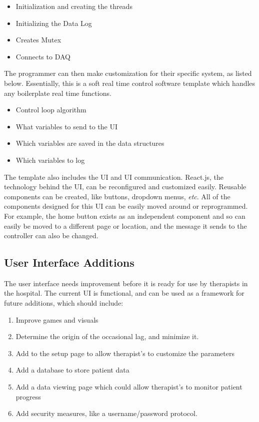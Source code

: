 \documentclass[12pt]{report}
\begin{document}
	\begin{itemize}
		\item Initialization and creating the threads
		\item Initializing the Data Log
		\item Creates Mutex
		\item Connects to DAQ
	\end{itemize}
	
	The programmer can then make customization for their specific system, as listed below. Essentially, this is a soft real time control software template which handles any boilerplate real time functions.
	
	\begin{itemize}
		\item Control loop algorithm
		\item What variables to send to the UI
		\item Which variables are saved in the data structures 
		\item Which variables to log 
	\end{itemize}
	
	The template also includes the UI and UI communication. React.js, the technology behind the UI, can be reconfigured and customized easily. Reusable components can be created, like buttons, dropdown menus, \textit{etc}. All of the components designed for this UI can be easily moved around or reprogrammed. For example, the home button exists as an independent component and so can easily be moved to a different page or location, and the message it sends to the controller can also be changed. 	
	
	\subsection{User Interface Additions}
	
The user interface needs improvement before it is ready for use by therapists in the hospital. The current UI is functional, and can be used as a framework for future additions, which should include: 	
	
	\begin{enumerate}
		\item Improve games and visuals
		\item Determine the origin of the occasional lag, and minimize it.
		\item Add to the setup page to allow therapist's to customize the parameters
		\item Add a database to store patient data
		\item Add a data viewing page which could allow therapist's to monitor patient progress
		\item Add security measures, like a username/password protocol.  
	\end{enumerate}
	
\end{document}

